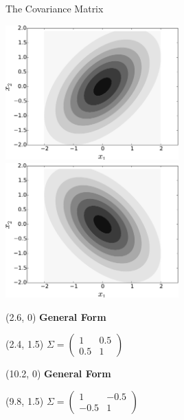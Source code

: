 \documentclass[pdf]{beamer}
\begin{document}
\begin{frame}{The Covariance Matrix}
\begin{center}
	\includegraphics[width=0.5\textwidth]{Gaussian2DContour3.pdf}
	\includegraphics[width=0.5\textwidth]{Gaussian2DContour4.pdf}
\end{center}

\begin{textblock}{8}(2.6, 0) %
\textbf{General Form}
\end{textblock}

\begin{textblock}{8}(2.4, 1.5) %
$\Sigma = 
\begin{pmatrix}
1 & 0.5\\
0.5 & 1
\end{pmatrix}
$
\end{textblock}

\begin{textblock}{8}(10.2, 0) %
\textbf{General Form}
\end{textblock}

\begin{textblock}{8}(9.8, 1.5) %
$\Sigma = 
\begin{pmatrix}
1 & -0.5\\
-0.5 & 1
\end{pmatrix}
$
\end{textblock}

\begin{center}
\end{center}
\end{frame}
\end{document}
